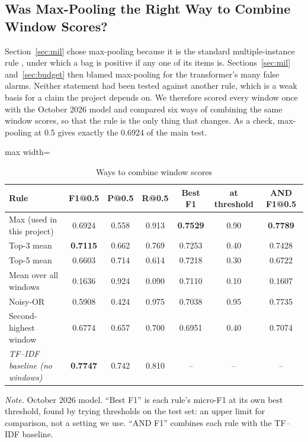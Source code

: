 \subsection{Was Max-Pooling the Right Way to Combine Window Scores?}
\label{sec:pooling}
Section~\ref{sec:mil} chose max-pooling because it is the standard multiple-instance rule \cite{maron1998mil}, under which a bag is positive if any one of its items is. Sections~\ref{sec:mil} and~\ref{sec:budget} then blamed max-pooling for the transformer's many false alarms. Neither statement had been tested against another rule, which is a weak basis for a claim the project depends on. We therefore scored every window once with the October 2026 model and compared six ways of combining the same window scores, so that the rule is the only thing that changes. As a check, max-pooling at 0.5 gives exactly the 0.6924 of the main test.

\begin{table}[!htbp]
\centering
\caption{Ways to combine window scores}
\label{tab:pooling}
\small
\begin{adjustbox}{max width=\textwidth}
\begin{tabular}{lcccccc}
\toprule
\textbf{Rule} & \textbf{F1@0.5} & \textbf{P@0.5} & \textbf{R@0.5} & \textbf{Best F1} & \textbf{at threshold} & \textbf{AND F1@0.5}\\
\midrule
Max (used in this project) & 0.6924 & 0.558 & 0.913 & \textbf{0.7529} & 0.90 & \textbf{0.7789}\\
Top-3 mean                & \textbf{0.7115} & 0.662 & 0.769 & 0.7253 & 0.40 & 0.7428\\
Top-5 mean                & 0.6603 & 0.714 & 0.614 & 0.7218 & 0.30 & 0.6722\\
Mean over all windows     & 0.1636 & 0.924 & 0.090 & 0.7110 & 0.10 & 0.1607\\
Noisy-OR                  & 0.5908 & 0.424 & 0.975 & 0.7038 & 0.95 & 0.7735\\
Second-highest window     & 0.6774 & 0.657 & 0.700 & 0.6951 & 0.40 & 0.7074\\
\midrule
\emph{TF--IDF baseline (no windows)} & \textbf{0.7747} & 0.742 & 0.810 & -- & -- & --\\
\bottomrule
\end{tabular}
\end{adjustbox}

{\footnotesize\singlespacing \emph{Note.} October 2026 model. ``Best F1'' is each rule's micro-F1 at its own best threshold, found by trying thresholds on the test set: an upper limit for comparison, not a setting we use. ``AND F1'' combines each rule with the TF--IDF baseline.\par}
\end{table}

